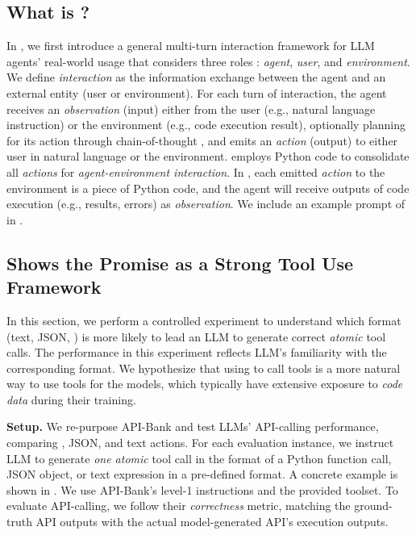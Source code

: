 \subsection{What is \approach?}
\label{sec:codeact_definition}

In , we first introduce a general multi-turn interaction framework for LLM agents' real-world usage that considers three roles \citep{yang2024unified}: \textit{agent}, \textit{user}, and \textit{environment}.
% 
We define \textit{interaction} as the information exchange between the agent and an external entity (user or environment).
% 
For each turn of interaction, the agent receives an \textit{observation} (input) either from the user (e.g., natural language instruction) or the environment (e.g., code execution result), optionally planning for its action through chain-of-thought \citep{wei2022chain}, and emits an \textit{action} (output) to either user in natural language or the environment.
% 
\approach employs Python code to consolidate all \textit{actions} for \textit{agent-environment interaction}. In \approach, each emitted \textit{action} to the environment is a piece of Python code, and the agent will receive outputs of code execution (e.g., results, errors) as \textit{observation}.
% 
We include an example prompt of \approach in .


\subsection{\approach Shows the Promise as a Strong Tool Use Framework}
\label{sec:data-factor-format}
In this section, we perform a controlled experiment to understand which format (text, JSON, \approach) is more likely to lead an LLM to generate correct \textit{atomic} tool calls.
% 
The performance in this experiment reflects LLM's familiarity with the corresponding format.
We hypothesize that using \approach to call tools is a more natural way to use tools for the models, which typically have extensive exposure to \textit{code data} during their training.

\noindent \textbf{Setup.}
We re-purpose API-Bank \citep{li2023apibank} and test LLMs' API-calling performance, comparing \approach, JSON, and text actions.
% 
For each evaluation instance, we instruct LLM to generate \textit{one atomic} tool call in the format of a Python function call, JSON object, or text expression in a pre-defined format. A concrete example is shown in .
% 
We use API-Bank's level-1 instructions and the provided toolset. To evaluate API-calling, we follow their \textit{correctness} metric, matching the ground-truth API outputs with the actual model-generated API's execution outputs.

